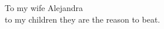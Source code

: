 
\thispagestyle{empty}
\vspace*{17mm}

\begin{flushright}
\begin{itshape}

To my wife Alejandra\\
to my children
they are the reason to beat.

\end{itshape}
\end{flushright}

